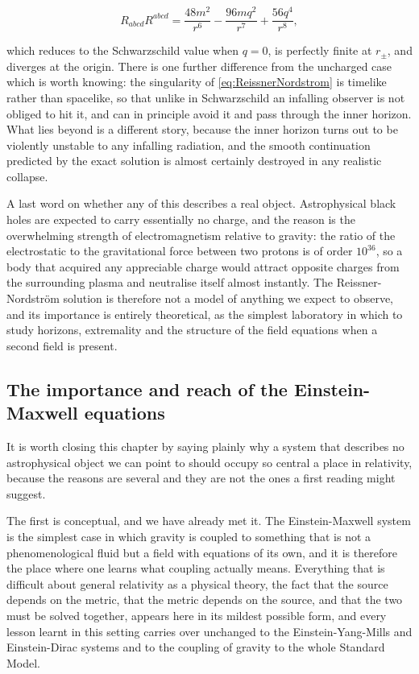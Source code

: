        \begin{equation}\label{eq:RNKretschmann}
            R_{abcd}R^{abcd} = \frac{48m^2}{r^6} - \frac{96mq^2}{r^7} + \frac{56q^4}{r^8},
        \end{equation}

        which reduces to the Schwarzschild value when $q=0$, is perfectly finite at $r_{\pm}$, and diverges at the origin. There is one further difference from the uncharged case which is worth knowing: the singularity of \ref{eq:ReissnerNordstrom} is timelike rather than spacelike, so that unlike in Schwarzschild an infalling observer is not obliged to hit it, and can in principle avoid it and pass through the inner horizon. What lies beyond is a different story, because the inner horizon turns out to be violently unstable to any infalling radiation, and the smooth continuation predicted by the exact solution is almost certainly destroyed in any realistic collapse.

        A last word on whether any of this describes a real object. Astrophysical black holes are expected to carry essentially no charge, and the reason is the overwhelming strength of electromagnetism relative to gravity: the ratio of the electrostatic to the gravitational force between two protons is of order $10^{36}$, so a body that acquired any appreciable charge would attract opposite charges from the surrounding plasma and neutralise itself almost instantly. The Reissner-Nordström solution is therefore not a model of anything we expect to observe, and its importance is entirely theoretical, as the simplest laboratory in which to study horizons, extremality and the structure of the field equations when a second field is present.

    \subsection{The importance and reach of the Einstein-Maxwell equations}

        It is worth closing this chapter by saying plainly why a system that describes no astrophysical object we can point to should occupy so central a place in relativity, because the reasons are several and they are not the ones a first reading might suggest.

        The first is conceptual, and we have already met it. The Einstein-Maxwell system is the simplest case in which gravity is coupled to something that is not a phenomenological fluid but a field with equations of its own, and it is therefore the place where one learns what coupling actually means. Everything that is difficult about general relativity as a physical theory, the fact that the source depends on the metric, that the metric depends on the source, and that the two must be solved together, appears here in its mildest possible form, and every lesson learnt in this setting carries over unchanged to the Einstein-Yang-Mills and Einstein-Dirac systems and to the coupling of gravity to the whole Standard Model.

